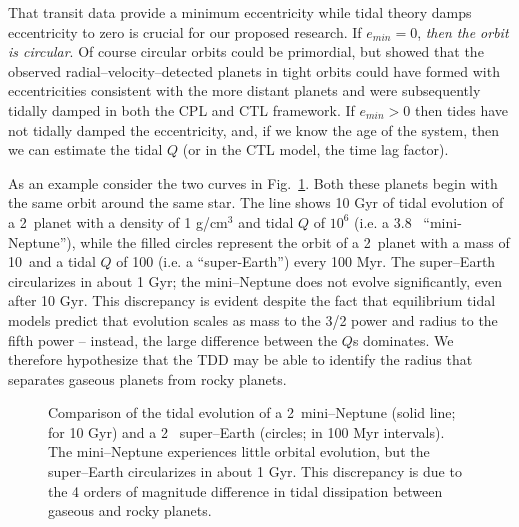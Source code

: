 \medskip
{\centerline{}}
\smallskip

That transit data provide a minimum eccentricity while tidal theory
damps eccentricity to zero is crucial for our proposed research. If
$e_{min} = 0$, \textit{then the orbit is circular}.  Of course circular
orbits could be primordial, but \cite{Jackson08a,Matsumura10} showed
that the observed radial--velocity--detected planets in tight orbits
could have formed with eccentricities consistent with the more distant
planets and were subsequently tidally damped in both the CPL and CTL
framework.  If $e_{min} > 0$ then tides have not tidally damped the
eccentricity, and, if we know the age of the system, then we can
estimate the tidal $Q$ (or in the CTL model, the time lag factor).

As an example consider the two curves in Fig.~\ref{fig:compareQ}.
Both these planets begin with the same orbit around the same star.
The line shows 10 Gyr of tidal evolution of a 2~\rearth planet with a
density of 1 g/cm$^3$ and tidal $Q$ of $10^6$ (i.e. a 3.8~\mearth
``mini-Neptune''), while the filled circles represent the orbit of a
2~\rearth planet with a mass of 10~\mearth and a tidal $Q$ of 100
(i.e. a ``super-Earth'') every 100 Myr.  The super--Earth circularizes
in about 1 Gyr; the mini--Neptune does not evolve significantly, even
after 10 Gyr.  This discrepancy is evident despite the fact that
equilibrium tidal models predict that evolution scales as mass to the
3/2 power and radius to the fifth power -- instead, the large
difference between the $Q$s dominates.  We therefore hypothesize that
the TDD may be able to identify the radius that separates gaseous
planets from rocky planets.

\begin{figure}[h]
\centering
\begin{minipage}{2.7in}
\end{minipage}
\begin{minipage}{2.7in}
\caption{\label{fig:compareQ}Comparison of the tidal evolution of a
  2~\rearth mini--Neptune (solid line; for 10 Gyr) and a 2~\rearth
  super--Earth (circles; in 100 Myr intervals).  The mini--Neptune
  experiences little orbital evolution, but the super--Earth
  circularizes in about 1 Gyr.  This discrepancy is due to the 4
  orders of magnitude difference in tidal dissipation between gaseous
  and rocky planets.}
\end{minipage}
\end{figure}

